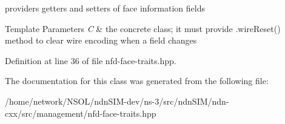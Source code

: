 providers getters and setters of face information fields 


\begin{DoxyTemplParams}{Template Parameters}
{\em C} & the concrete class; it must provide .wire\+Reset() method to clear wire encoding when a field changes \\
\hline
\end{DoxyTemplParams}


Definition at line 36 of file nfd-\/face-\/traits.\+hpp.



The documentation for this class was generated from the following file\+:\begin{DoxyCompactItemize}
\item 
/home/network/\+N\+S\+O\+L/ndn\+S\+I\+M-\/dev/ns-\/3/src/ndn\+S\+I\+M/ndn-\/cxx/src/management/nfd-\/face-\/traits.\+hpp\end{DoxyCompactItemize}
